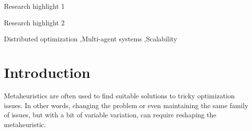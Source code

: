 \documentclass[preprint,12pt]{elsarticle}
\begin{document}
\begin{frontmatter}
\begin{abstract}
\begin{comment}
This was compiled through chatGpt

This work describes the results of a scalability experiment conducted on a simulation system using various metaheuristic configurations. The experiment was carried out in four sets of executions with 18 agents and different configurations. The latency for four of the main messages exchanged was recorded and the results were analyzed using statistical methods. The ANOVA and Tukey-HSD tests were applied to the UpdateGlobalSummary message, while the Kruskal-Wallis and Conover-Iman tests were used for the UpdateRegionSummary and RegionSplit messages. The results indicate that the number of nodes in the simulation cluster affects the performance of the system, and some configurations show better performance than others. The experiment's findings could be useful for researchers and practitioners in the field of simulation systems and metaheuristics.


esta parte do GPT, por exemplo, não está legal\\


The ANOVA and Tukey-HSD tests were applied to the UpdateGlobalSummary message, while the Kruskal-Wallis and Conover-Iman tests were used for the UpdateRegionSummary and RegionSplit messages.

\end{comment}
\end{abstract}


\begin{highlights}
\item Research highlight 1
\item Research highlight 2
\end{highlights}

\begin{keyword}
Distributed optimization \sep Multi-agent systems \sep Scalability
\end{keyword}

\end{frontmatter}


\section{Introduction}

Metaheuristics are often used to find suitable solutions to tricky optimization issues. In other words, changing the problem or even maintaining the same family of issues, but with a bit of variable variation, can require reshaping the metaheuristic.
\end{document}
